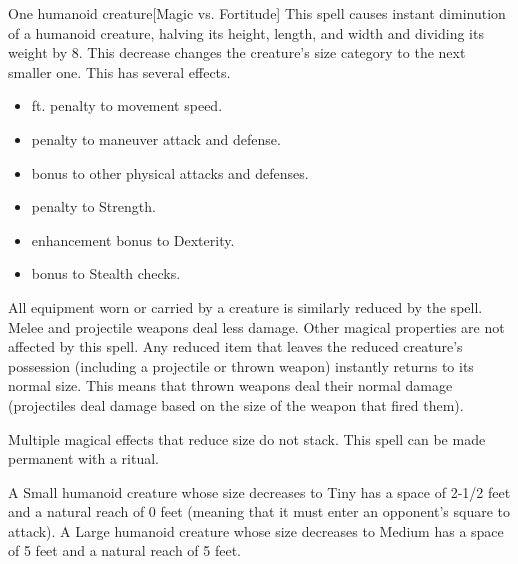 \begin{spellheader}
    \spellrng{\rngclose}
    \spelldur{\durshort \dismissable}
\end{spellheader}
\begin{spelleffects}
    \begin{spelltarget}{One humanoid creature}[Magic vs. Fortitude]
        \spellsuccess This spell causes instant diminution of a humanoid creature, halving its height, length, and width and dividing its weight by 8. This decrease changes the creature's size category to the next smaller one. This has several effects.
        \begin{itemize} 
            \item {} ft. penalty to movement speed.
            \item {} penalty to maneuver attack and defense.
            \item {} bonus to other physical attacks and defenses.
            \item {} penalty to Strength.
            \item {} enhancement bonus to Dexterity.
            \item {} bonus to Stealth checks.
        \end{itemize}
        \par All equipment worn or carried by a creature is similarly reduced by the spell. Melee and projectile weapons deal less damage. Other magical properties are not affected by this spell. Any reduced item that leaves the reduced creature's possession (including a projectile or thrown weapon) instantly returns to its normal size. This means that thrown weapons deal their normal damage (projectiles deal damage based on the size of the weapon that fired them).
    \end{spelltarget}
\end{spelleffects}
\begin{spellfooter}
    \spellnotes Multiple magical effects that reduce size do not stack. This spell can be made permanent with a  ritual.
    \par A Small humanoid creature whose size decreases to Tiny has a space of 2-1/2 feet and a natural reach of 0 feet (meaning that it must enter an opponent's square to attack). A Large humanoid creature whose size decreases to Medium has a space of 5 feet and a natural reach of 5 feet.
\end{spellfooter}

